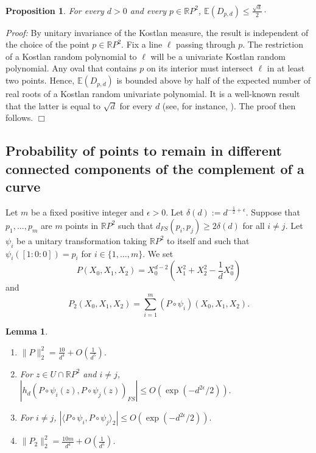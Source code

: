 \documentclass [11pt]{amsart}
\newtheorem {lemma}[theorem]{Lemma}
\newtheorem {proposition}[theorem]{Proposition}
\theoremstyle{remark}
\numberwithin{equation}{section}
\numberwithin{theorem}{section}
\begin{document}
\begin{proposition} 
For every $d>0$ and every $p\in \mathbb{R}P^2$,  $\displaystyle{\mathbb{E}(D_{p,d})\leq \frac{\sqrt{d}}{2}\cdot}$
\end{proposition} 

\noindent \textit{Proof:} By unitary invariance of the Kostlan measure, the result is independent of the choice of the point $p\in \mathbb{R}P^2$. Fix a line $\ell$ passing through $p$. The restriction of a Kostlan random polynomial to $\ell$ will be a univariate Kostlan random polynomial. Any oval that contains $p$ on its interior must intersect $\ell$ in at least two points. Hence, $\mathbb{E}(D_{p,d})$ is bounded above by half of the expected number of real roots of a Kostlan random univariate polynomial. It is a well-known result that the latter is equal to $\sqrt{d}$ for every $d$ (see, for instance, \cite{EK}). The proof then follows. \hfill $\Box$ 


\subsection{Probability of points to remain in different connected components of the complement of a curve}
Let $m$ be a fixed positive integer and $\epsilon>0$. Let $\delta(d):=d^{-\frac{1}{2}+\epsilon}$. Suppose that $p_{1},\ldots,p_{m}$ are $m$ points in $\mathbb{R}P^2$ such that $d_{FS}(p_{i},p_{j})\geq 2\delta(d)$ for all $i\neq j$. Let $\psi_{i}$ be a unitary transformation taking $\mathbb{R}P^2$ to itself and such that $\psi_{i}([1:0:0])=p_{i}$ for $i\in \{1,\ldots,m\}$. We set 
\[ P(X_{0},X_{1},X_{2})=X_{0}^{d-2}\left(X_{1}^2+X_{2}^2-\frac{1}{d}X_{0}^2\right) \] 
and 
\[ P_{2}(X_{0},X_{1},X_{2})=\sum_{i=1}^{m} (P\circ \psi_{i})(X_{0},X_{1},X_{2}). \] 

\begin{lemma}\label{manyestimates}
\begin{enumerate}
\item $\displaystyle{ \|P\|_{2}^2=\frac{10}{d^4}+O\left(\frac{1}{d^5}\right).}$ 
\item For $z\in U\cap \mathbb{R}P^2$ and $i\neq j$, $\displaystyle{|h_{d}(P\circ \psi_{i}(z),P\circ \psi_{j}(z))_{FS}|\leq O\left(\exp\left(-d^{2\epsilon}/2\right)\right).}$ 
\item For $i\neq j$, $|\langle P\circ \psi_{i}, P\circ \psi_{j} \rangle_{2}|\leq O\left(\exp\left(-d^{2\epsilon}/2\right)\right).$
\item $\displaystyle{ \|P_{2}\|_{2}^2=\frac{10 m}{d^4}+O\left(\frac{1}{d^5}\right)}$. 
\end{enumerate}
\end{lemma}
\end{document}
